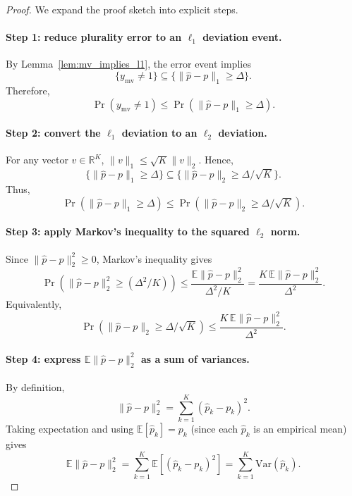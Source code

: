 \begin{proof}
We expand the proof sketch into explicit steps.

\paragraph{Step 1: reduce plurality error to an $\ell_1$ deviation event.}
By Lemma~\ref{lem:mv_implies_l1}, the error event implies
\[
\{y_{\mathrm{mv}}\neq 1\} \subseteq \{\|\hat p-p\|_1 \ge \Delta\}.
\]
Therefore,
\begin{equation}
\Pr(y_{\mathrm{mv}}\neq 1) \le \Pr(\|\hat p-p\|_1 \ge \Delta).
\label{eq:step1_bound}
\end{equation}

\paragraph{Step 2: convert the $\ell_1$ deviation to an $\ell_2$ deviation.}
For any vector \(v\in\mathbb{R}^K\), \(\|v\|_1\le \sqrt{K}\|v\|_2\).
Hence,
\[
\{\|\hat p-p\|_1 \ge \Delta\} \subseteq \{\|\hat p-p\|_2 \ge \Delta/\sqrt{K}\}.
\]
Thus,
\begin{equation}
\Pr(\|\hat p-p\|_1 \ge \Delta) \le \Pr(\|\hat p-p\|_2 \ge \Delta/\sqrt{K}).
\label{eq:step2_bound}
\end{equation}

\paragraph{Step 3: apply Markov's inequality to the squared $\ell_2$ norm.}
Since \(\|\hat p-p\|_2^2\ge 0\), Markov's inequality gives
\[
\Pr(\|\hat p-p\|_2^2 \ge (\Delta^2/K)) \le \frac{\mathbb{E}\|\hat p-p\|_2^2}{\Delta^2/K}
= \frac{K\,\mathbb{E}\|\hat p-p\|_2^2}{\Delta^2}.
\]
Equivalently,
\begin{equation}
\Pr(\|\hat p-p\|_2 \ge \Delta/\sqrt{K})
\le \frac{K\,\mathbb{E}\|\hat p-p\|_2^2}{\Delta^2}.
\label{eq:step3_markov}
\end{equation}

\paragraph{Step 4: express $\mathbb{E}\|\hat p-p\|_2^2$ as a sum of variances.}
By definition,
\[
\|\hat p-p\|_2^2 = \sum_{k=1}^K (\hat p_k-p_k)^2.
\]
Taking expectation and using \(\mathbb{E}[\hat p_k]=p_k\) (since each \(\hat p_k\) is an empirical mean) gives
\begin{equation}
\mathbb{E}\|\hat p-p\|_2^2
= \sum_{k=1}^K \mathbb{E}[(\hat p_k-p_k)^2]
= \sum_{k=1}^K \mathrm{Var}(\hat p_k).
\label{eq:step4_varsum}
\end{equation}


\end{proof}
